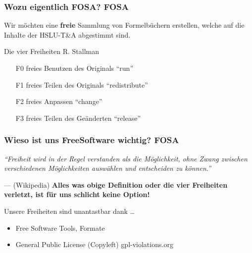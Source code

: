 \begin{frame}
	\frametitle{Wozu eigentlich FOSA? \hfill{} \footnotesize{FOSA}}
	Wir möchten eine \textbf{freie} Sammlung von 
	Formelbüchern erstellen, welche auf die Inhalte der HSLU-T\&A
	abgestimmt sind.
	\vfill{}
	\begin{exampleblock}{Die vier Freiheiten 
		\hfill{} 
		\footnotesize{R. Stallman}}
		\begin{itemize}
			\item[F0] freies Benutzen des Originals 
				\hfill{} \footnotesize{"`run"'}
				\normalsize
			\item[F1] freies Teilen des Originals
				\hfill{} \footnotesize{"`redistribute"'}
				\normalsize
			\item[F2] freies Anpassen 
				\hfill{} \footnotesize{"`change"'}
				\normalsize
			\item[F3] freies Teilen des Geänderten 
				\hfill{} \footnotesize{"`release"'}
				\normalsize
		\end{itemize}
	\end{exampleblock}
\end{frame}

\begin{frame}
	\frametitle{Wieso ist uns FreeSoftware wichtig? 
		\hfill{} 
		\footnotesize{FOSA}}
	\textit{"`Freiheit wird in der Regel verstanden als die 
	Möglichkeit, ohne Zwang zwischen verschiedenen Möglichkeiten 
	auswählen und entscheiden zu können."'} 
	
	\hfill{} --- (Wikipedia)
	\vfill{}
	\textbf{Alles was obige Definition oder die vier Freiheiten
	verletzt, ist für uns schlicht keine Option!}
	\vfill{}
	\begin{exampleblock}{Unsere Freiheiten sind unantastbar dank \dots}
		\begin{itemize}
			\item Free Software 
				\hfill{} 
				\footnotesize{Tools, Formate}
				\normalsize
			\item General Public License (Copyleft) 
				\hfill{}
				\footnotesize{gpl-violations.org}
				\normalsize
		\end{itemize}
	\end{exampleblock}
\end{frame}

